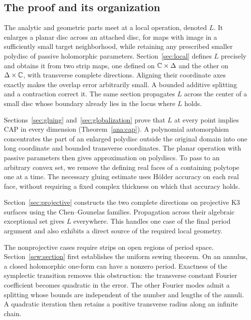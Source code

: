 \subsection{The proof and its organization}

The analytic and geometric parts meet at a local operation, denoted
$L$. It enlarges a planar disc across an attached disc, for maps with
image in a sufficiently small target neighborhood, while retaining
any prescribed smaller polydisc of passive holomorphic parameters.
Section~\ref{sec:local} defines $L$ precisely and obtains it from two
strip maps, one defined on $\mathbb C\times\Delta$ and the other on
$\Delta\times\mathbb C$, with transverse complete directions. Aligning
their coordinate axes exactly makes the overlap error arbitrarily
small. A bounded additive splitting and a contraction correct it.
The same section propagates $L$ across the center of a small disc
whose boundary already lies in the locus where $L$ holds.

Sections~\ref{sec:gluing} and~\ref{sec:globalization} prove that $L$
at every point implies CAP in every dimension
(Theorem~\ref{ana:cap}). A polynomial automorphism concentrates the
part of an enlarged polydisc outside the original domain into one
long coordinate and bounded transverse coordinates. The planar
operation with passive parameters then gives approximation on
polydiscs. To pass to an arbitrary convex set, we remove the defining
real faces of a containing polytope one at a time. The necessary
gluing estimate uses H\"older accuracy on each real face, without
requiring a fixed complex thickness on which that accuracy holds.

Section~\ref{sec:projective} constructs the two complete directions
on projective K3 surfaces using the Chen--Gounelas families. Propagation
across their algebraic exceptional set gives $L$ everywhere. This
handles one case of the final period argument and also exhibits a
direct source of the required local geometry.

The nonprojective cases require strips on open regions of period
space. Section~\ref{sew:section} first establishes the uniform sewing
theorem. On an annulus, a closed holomorphic one-form can have a
nonzero period. Exactness of the symplectic transition removes this
obstruction: the transverse constant Fourier coefficient becomes
quadratic in the error. The other Fourier modes admit a splitting
whose bounds are independent of the number and lengths of the
annuli. A quadratic iteration then retains a positive transverse
radius along an infinite chain.

